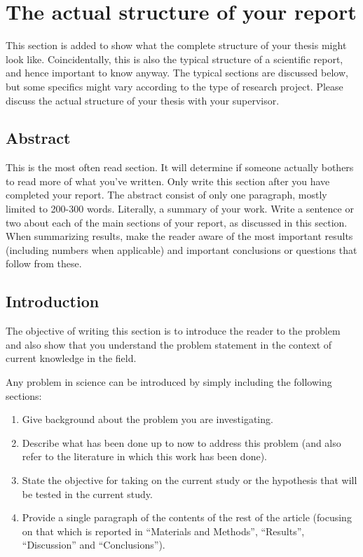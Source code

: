 \documentclass[../main.tex]{subfiles}
\begin{document}
\section{The actual structure of your report} %
\label{sec:developments}

This section is added to show what the complete structure of your thesis
might look like. Coincidentally, this is also the typical structure of a scientific report, and hence important to know anyway. 
The typical sections are discussed below, but some specifics might vary according to the type of research project. Please discuss the actual structure of your thesis with your supervisor.

\subsection{Abstract}
\label{sec:Abstract}
This is the most often read section. It will determine if someone actually bothers to read more
of what you've written. Only write this section after you have completed your
report. The abstract consist of only one paragraph, mostly limited
to 200-300 words. Literally, a summary of your work. Write a sentence
or two about each of the main sections of your report, as discussed in this section. When
summarizing results, make the reader aware of the most important results (including numbers when applicable)
and important conclusions or questions that follow from these.


\subsection{Introduction}
\label{sec:Introduction}
The objective of writing this section is to introduce the reader to
the problem and also show that you understand the problem statement
in the context of current knowledge in the field.

Any problem in science can be introduced by simply including the following
sections:
\begin{enumerate}
\item Give background about the problem you are investigating. 
\item Describe what has been done up to now to address this problem (and
also refer to the literature in which this work has been done). 
\item State the objective for taking on the current study or the hypothesis
that will be tested in the current study. 
\item Provide a single paragraph of the contents of the rest of the article
(focusing on that which is reported in \textquotedblleft{}Materials and Methods\textquotedblright{},
\textquotedblleft{}Results\textquotedblright{}, \textquotedblleft{}Discussion\textquotedblright{}
and \textquotedblleft{}Conclusions\textquotedblright{}).
\end{enumerate}
\end{document}
